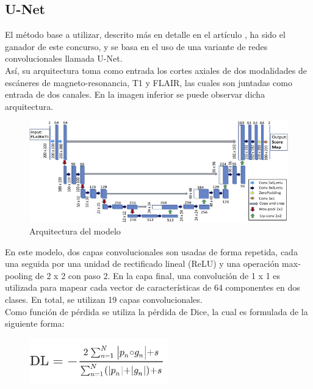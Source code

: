 \documentclass[spanish,a4paper, 11pt]{article}
\numberwithin{equation}{section}
\numberwithin{table}{section}
\numberwithin{figure}{section}
\begin{document}
\subsection{U-Net}

El método base a utilizar, descrito más en detalle en el artículo  \citep{Li2018}, ha sido el ganador de este concurso, y se basa en el uso de una variante de redes convolucionales llamada U-Net.\\
	
Así, su arquitectura toma como entrada los cortes axiales de dos modalidades de escáneres de magneto-resonancia, T1 y FLAIR, las cuales son juntadas como entrada de dos canales. En la imagen inferior se puede observar dicha arquitectura.

	\begin{figure}[H]
	\centering
		\includegraphics[width=\linewidth]{img1.jpg}
		\caption[\textit{Arquitectura del modelo}]{Arquitectura del modelo}
		\label{fig:FCC}
	\end{figure}

En este modelo, dos capas convolucionales son usadas de forma repetida, cada una seguida por una unidad de rectificado lineal (ReLU) y una operación max-pooling de 2 x 2 con paso 2. En la capa final, una convolución de 1 x 1 es utilizada para mapear cada vector de características de 64 componentes en dos clases. En total, se utilizan 19 capas convolucionales. \\

Como función de pérdida se utiliza la pérdida de Dice, la cual es formulada de la siguiente forma:
	
	\begin{figure}[H]
	 	\centering
		\includegraphics[height=2cm]{dice_loss.png}
		\label{fig:Dice}
	\end{figure}
	
\end{document}
